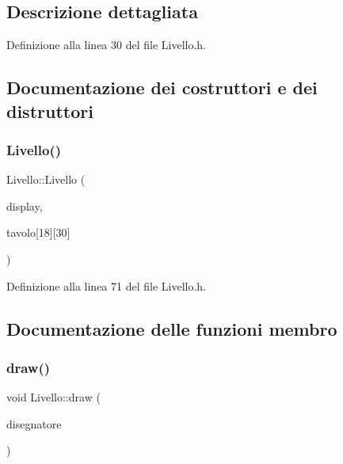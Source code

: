 \subsection{Descrizione dettagliata}


Definizione alla linea 30 del file Livello.\+h.



\subsection{Documentazione dei costruttori e dei distruttori}
\mbox{\label{class_livello_a7618f4bfd6008dbcbf3fa92fb84767e9}} 
\subsubsection{\texorpdfstring{Livello()}{Livello()}}
{\footnotesize\ttfamily Livello\+::\+Livello (\begin{DoxyParamCaption}\item[{A\+L\+L\+E\+G\+R\+O\+\_\+\+D\+I\+S\+P\+L\+AY $\ast$}]{display,  }\item[{unsigned}]{tavolo\mbox{[}18\mbox{]}\mbox{[}30\mbox{]} }\end{DoxyParamCaption})\hspace{0.3cm}{\ttfamily [inline]}}



Definizione alla linea 71 del file Livello.\+h.



\subsection{Documentazione delle funzioni membro}
\mbox{\label{class_livello_ace88d8069241a9879fe2ebbc9cd30cd5}} 
\subsubsection{\texorpdfstring{draw()}{draw()}}
{\footnotesize\ttfamily void Livello\+::draw (\begin{DoxyParamCaption}\item[{\hyperlink{class_drawer}{Drawer} \&}]{disegnatore }\end{DoxyParamCaption})\hspace{0.3cm}{\ttfamily [inline]}}



